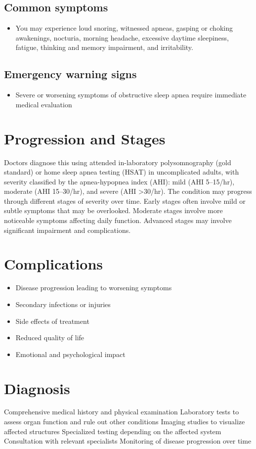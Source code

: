 \subsection{Common symptoms}
\begin{itemize}[noitemsep]
  \item You may experience loud snoring, witnessed apneas, gasping or choking awakenings, nocturia, morning headache, excessive daytime sleepiness, fatigue, thinking and memory impairment, and irritability. 
  \end{itemize}

\subsection{Emergency warning signs}
\begin{itemize}[noitemsep]
  \item Severe or worsening symptoms of obstructive sleep apnea require immediate medical evaluation
\end{itemize}
\section{Progression and Stages}
Doctors diagnose this using attended in-laboratory polysomnography (gold standard) or home sleep apnea testing (HSAT) in uncomplicated adults, with severity classified by the apnea-hypopnea index (AHI): mild (AHI 5--15/hr), moderate (AHI 15--30/hr), and severe (AHI >30/hr). The condition may progress through different stages of severity over time. Early stages often involve mild or subtle symptoms that may be overlooked. Moderate stages involve more noticeable symptoms affecting daily function. Advanced stages may involve significant impairment and complications.
\section{Complications}
\begin{itemize}[noitemsep]
  \item Disease progression leading to worsening symptoms
  \item Secondary infections or injuries
  \item Side effects of treatment
  \item Reduced quality of life
  \item Emotional and psychological impact
\end{itemize}
\section{Diagnosis}
Comprehensive medical history and physical examination Laboratory tests to assess organ function and rule out other conditions Imaging studies to visualize affected structures Specialized testing depending on the affected system Consultation with relevant specialists Monitoring of disease progression over time

